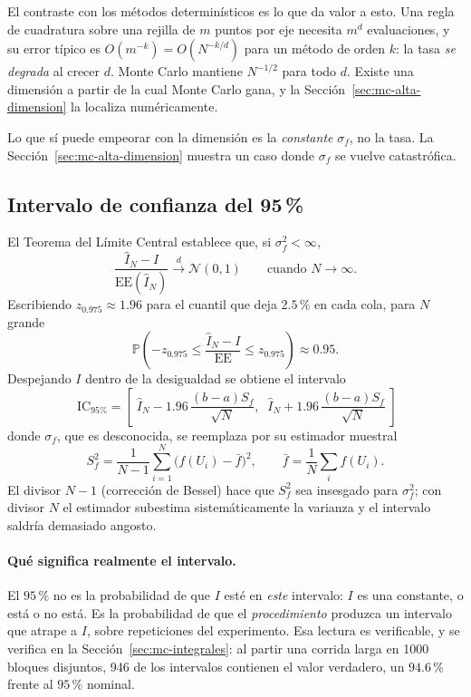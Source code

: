 El contraste con los métodos determinísticos es lo que da valor a esto. Una
regla de cuadratura sobre una rejilla de $m$ puntos por eje necesita $m^d$
evaluaciones, y su error típico es $O(m^{-k}) = O(N^{-k/d})$ para un método de
orden $k$: la tasa \emph{se degrada} al crecer $d$. Monte Carlo mantiene
$N^{-1/2}$ para todo $d$. Existe una dimensión a partir de la cual Monte Carlo
gana, y la Sección~\ref{sec:mc-alta-dimension} la localiza numéricamente.

Lo que sí puede empeorar con la dimensión es la \emph{constante} $\sigma_f$,
no la tasa. La Sección~\ref{sec:mc-alta-dimension} muestra un caso donde
$\sigma_f$ se vuelve catastrófica.

\subsection{Intervalo de confianza del 95\,\%}

El Teorema del Límite Central establece que, si $\sigma_f^2 < \infty$,
\[
  \frac{\hat I_N - I}{\mathrm{EE}(\hat I_N)} \xrightarrow{\;d\;} \mathcal{N}(0,1)
  \qquad \text{cuando } N \to \infty .
\]
Escribiendo $z_{0.975} \approx 1.96$ para el cuantil que deja $2.5\,\%$ en cada
cola, para $N$ grande
\[
  \mathbb{P}\!\left(-z_{0.975} \le \frac{\hat I_N - I}{\mathrm{EE}} \le z_{0.975}\right)
  \approx 0.95 .
\]
Despejando $I$ dentro de la desigualdad se obtiene el intervalo
\begin{equation}
  \boxed{\;
  \mathrm{IC}_{95\%} = \left[\;
    \hat I_N - 1.96\,\frac{(b-a)S_f}{\sqrt{N}},\;\;
    \hat I_N + 1.96\,\frac{(b-a)S_f}{\sqrt{N}}
  \;\right]}
  \label{eq:ic}
\end{equation}
donde $\sigma_f$, que es desconocida, se reemplaza por su estimador muestral
\begin{equation}
  S_f^2 = \frac{1}{N-1}\sum_{i=1}^N \bigl(f(U_i) - \bar f\bigr)^2 ,
  \qquad \bar f = \frac1N \sum_i f(U_i).
  \label{eq:S}
\end{equation}
El divisor $N-1$ (corrección de Bessel) hace que $S_f^2$ sea insesgado para
$\sigma_f^2$; con divisor $N$ el estimador subestima sistemáticamente la
varianza y el intervalo saldría demasiado angosto.

\paragraph{Qué significa realmente el intervalo.} El $95\,\%$ no es la
probabilidad de que $I$ esté en \emph{este} intervalo: $I$ es una constante, o
está o no está. Es la probabilidad de que el \emph{procedimiento} produzca un
intervalo que atrape a $I$, sobre repeticiones del experimento. Esa lectura es
verificable, y se verifica en la Sección~\ref{sec:mc-integrales}: al partir una
corrida larga en 1000 bloques disjuntos, 946 de los intervalos contienen el
valor verdadero, un $94.6\,\%$ frente al $95\,\%$ nominal.

